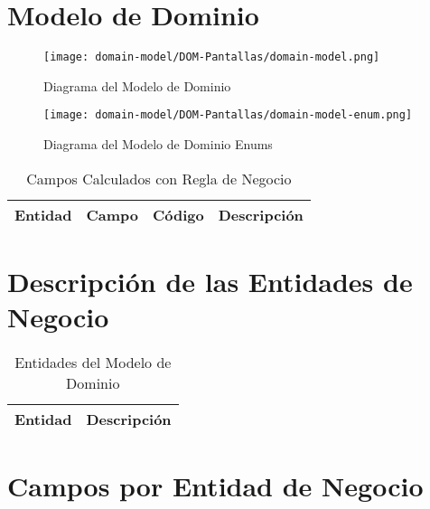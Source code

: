 \clearpage
\section{Modelo de Dominio} \label{sec:dom-pantallas}
\begin{figure}[H]
\begin{center}
	\label{tab:uml-domain-model}
	\texttt{[image: domain-model/DOM-Pantallas/domain-model.png]}
	\caption{Diagrama del Modelo de Dominio}
\end{center}
\end{figure}
\begin{figure}[H]
		\begin{center}
			\label{tab:uml-domain-model}
			\texttt{[image: domain-model/DOM-Pantallas/domain-model-enum.png]}
			\caption{Diagrama del Modelo de Dominio Enums}
		\end{center}
\end{figure}
\begin{table}[H]
			\caption{Campos Calculados con Regla de Negocio}
			\label{tab:entities}
			\begin{center}
			\begin{tabularx}{0.90\linewidth}{ X X X X}
				\hline
				\textbf{Entidad} & \textbf{Campo} & \textbf{C\'odigo} & \textbf{Descripci\'on} \\
				\hline
				\hline
			\end{tabularx}
			\end{center}
\end{table}

\clearpage
\section{Descripci\'on de las Entidades de Negocio} \label{sec:dom-entities-pantallas}

\begin{table}[H]
	\caption{Entidades del Modelo de Dominio}
	\label{tab:entities}
	\begin{center}
	\begin{tabularx}{0.90\linewidth}{ X X }
		\hline
		\textbf{Entidad} & \textbf{Descripci\'on} \\
		\hline
		\hline
	\end{tabularx}
	\end{center}
\end{table}
\section{Campos por Entidad de Negocio} \label{sec:entity-fields-pantallas}

